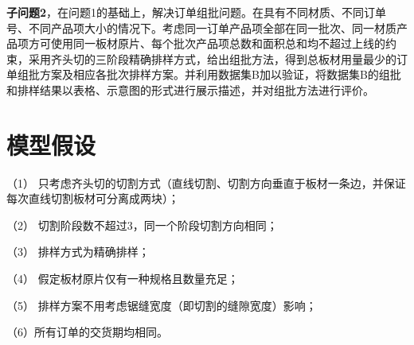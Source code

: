 \documentclass[bwprint]{gmcmthesis}
\begin{document}
\textbf{子问题2}，在问题1的基础上，解决订单组批问题。在具有不同材质、不同订单号、不同产品项大小的情况下。考虑同一订单产品项全部在同一批次、同一材质产品项方可使用同一板材原片、每个批次产品项总数和面积总和均不超过上线的约束，采用齐头切的三阶段精确排样方式，给出组批方法，得到总板材用量最少的订单组批方案及相应各批次排样方案。并利用数据集B加以验证，将数据集B的组批和排样结果以表格、示意图的形式进行展示描述，并对组批方法进行评价。

\newpage

\section{模型假设}

（1） 只考虑齐头切的切割方式（直线切割、切割方向垂直于板材一条边，并保证每次直线切割板材可分离成两块）；

（2） 切割阶段数不超过3，同一个阶段切割方向相同；

（3） 排样方式为精确排样；

（4） 假定板材原片仅有一种规格且数量充足；

（5） 排样方案不用考虑锯缝宽度（即切割的缝隙宽度）影响；

（6）所有订单的交货期均相同。

\quad
\end{document}
